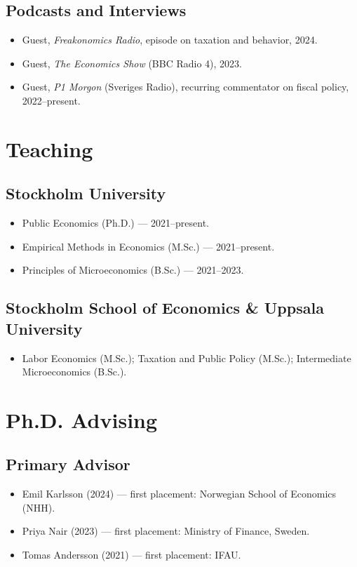 \documentclass[11pt]{article}
\begin{document}
\subsection{Podcasts and Interviews}
\begin{itemize}
\item Guest, \emph{Freakonomics Radio}, episode on taxation and behavior, 2024.
\item Guest, \emph{The Economics Show} (BBC Radio 4), 2023.
\item Guest, \emph{P1 Morgon} (Sveriges Radio), recurring commentator on fiscal policy, 2022--present.
\end{itemize}

\section{Teaching}
\subsection{Stockholm University}
\begin{itemize}
\item Public Economics (Ph.D.) --- 2021--present.
\item Empirical Methods in Economics (M.Sc.) --- 2021--present.
\item Principles of Microeconomics (B.Sc.) --- 2021--2023.
\end{itemize}
\subsection{Stockholm School of Economics \& Uppsala University}
\begin{itemize}
\item Labor Economics (M.Sc.); Taxation and Public Policy (M.Sc.); Intermediate Microeconomics (B.Sc.).
\end{itemize}

\section{Ph.D. Advising}
\subsection{Primary Advisor}
\begin{itemize}
\item Emil Karlsson (2024) --- first placement: Norwegian School of Economics (NHH).
\item Priya Nair (2023) --- first placement: Ministry of Finance, Sweden.
\item Tomas Andersson (2021) --- first placement: IFAU.
\end{itemize}
\end{document}

